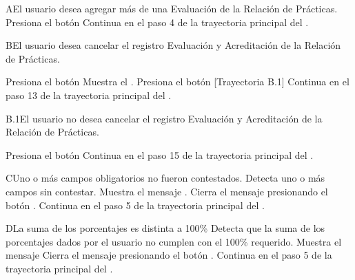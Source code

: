 \begin{UCtrayectoriaA}{A}{El usuario desea agregar más de una Evaluación de la Relación de Prácticas.}
    \UCpaso[\UCactor] Presiona el botón 
    \UCpaso Continua en el paso 4 de la trayectoria principal del .
    
\end{UCtrayectoriaA}

\begin{UCtrayectoriaA}{B}{El usuario desea cancelar el registro Evaluación y Acreditación de la Relación de Prácticas.}

    \UCpaso[\UCactor] Presiona el botón 
    \UCpaso Muestra el .
    \UCpaso[\UCactor] Presiona el botón  [Trayectoria B.1]
    \UCpaso Continua en el paso 13 de la trayectoria principal del .
    
\end{UCtrayectoriaA}

\begin{UCtrayectoriaA}{B.1}{El usuario no desea cancelar el registro Evaluación y Acreditación de la Relación de Prácticas.}
    
    \UCpaso[\UCactor] Presiona el botón 
    \UCpaso Continua en el paso 15 de la trayectoria principal del .
    
\end{UCtrayectoriaA}

\begin{UCtrayectoriaA}{C}{Uno o más campos obligatorios no fueron contestados.}
	\UCpaso Detecta uno o más campos sin contestar.
    \UCpaso Muestra el mensaje .
    \UCpaso[\UCactor] Cierra el mensaje presionando el botón .
    \UCpaso Continua en el paso 5 de la trayectoria principal del .
\end{UCtrayectoriaA}

\begin{UCtrayectoriaA}{D}{La suma de los porcentajes es distinta a 100\%}
    \UCpaso Detecta que la suma de los porcentajes dados por el usuario no cumplen con el 100\% requerido.
    \UCpaso Muestra el mensaje 
    \UCpaso[\UCactor] Cierra el mensaje presionando el botón .
    \UCpaso Continua en el paso 5 de la trayectoria principal del .
\end{UCtrayectoriaA}



